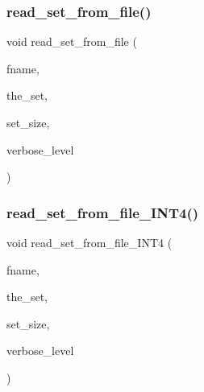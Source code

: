 \mbox{\label{util_8_c_a5de87b15d6633e4d4c78b22051fc8968}} 
\subsubsection{\texorpdfstring{read\+\_\+set\+\_\+from\+\_\+file()}{read\_set\_from\_file()}}
{\footnotesize\ttfamily void read\+\_\+set\+\_\+from\+\_\+file (\begin{DoxyParamCaption}\item[{const \mbox{\hyperlink{galois_8h_ab6cc7b4aeb6ea31aba2b3fbfc83ff5e6}{B\+Y\+TE}} $\ast$}]{fname,  }\item[{\mbox{\hyperlink{galois_8h_a09fddde158a3a20bd2dcadb609de11dc}{I\+NT}} $\ast$\&}]{the\+\_\+set,  }\item[{\mbox{\hyperlink{galois_8h_a09fddde158a3a20bd2dcadb609de11dc}{I\+NT}} \&}]{set\+\_\+size,  }\item[{\mbox{\hyperlink{galois_8h_a09fddde158a3a20bd2dcadb609de11dc}{I\+NT}}}]{verbose\+\_\+level }\end{DoxyParamCaption})}

\mbox{\label{util_8_c_a8638b609d7f95a4c08badffea650829a}} 
\subsubsection{\texorpdfstring{read\+\_\+set\+\_\+from\+\_\+file\+\_\+\+I\+N\+T4()}{read\_set\_from\_file\_INT4()}}
{\footnotesize\ttfamily void read\+\_\+set\+\_\+from\+\_\+file\+\_\+\+I\+N\+T4 (\begin{DoxyParamCaption}\item[{const \mbox{\hyperlink{galois_8h_ab6cc7b4aeb6ea31aba2b3fbfc83ff5e6}{B\+Y\+TE}} $\ast$}]{fname,  }\item[{\mbox{\hyperlink{galois_8h_a09fddde158a3a20bd2dcadb609de11dc}{I\+NT}} $\ast$\&}]{the\+\_\+set,  }\item[{\mbox{\hyperlink{galois_8h_a09fddde158a3a20bd2dcadb609de11dc}{I\+NT}} \&}]{set\+\_\+size,  }\item[{\mbox{\hyperlink{galois_8h_a09fddde158a3a20bd2dcadb609de11dc}{I\+NT}}}]{verbose\+\_\+level }\end{DoxyParamCaption})}

